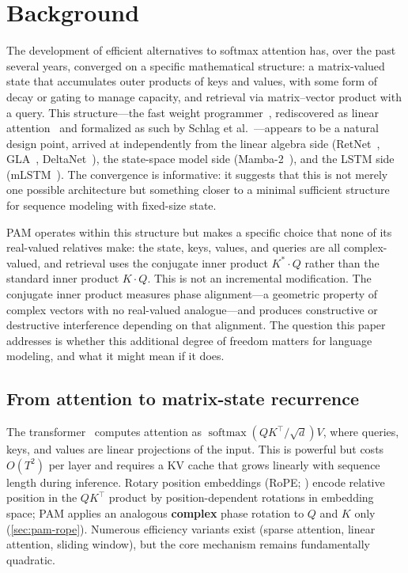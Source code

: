 \documentclass[11pt]{article}
\newcommand{\softmax}{\operatorname{softmax}}
\begin{document}
\section{Background}
\label{sec:related}

The development of efficient alternatives to softmax attention has, over the past several years, converged on a specific mathematical structure: a matrix-valued state that accumulates outer products of keys and values, with some form of decay or gating to manage capacity, and retrieval via matrix--vector product with a query. This structure---the fast weight programmer~\cite{schmidhuber1992learning}, rediscovered as linear attention~\cite{katharopoulos2020transformers} and formalized as such by Schlag et al.~\cite{schlag2021linear}---appears to be a natural design point, arrived at independently from the linear algebra side (RetNet~\cite{sun2023retentive}, GLA~\cite{yang2024gated}, DeltaNet~\cite{yang2024deltanet}), the state-space model side (Mamba-2~\cite{dao2024transformers}), and the LSTM side (mLSTM~\cite{beck2024xlstm}). The convergence is informative: it suggests that this is not merely one possible architecture but something closer to a minimal sufficient structure for sequence modeling with fixed-size state.

PAM operates within this structure but makes a specific choice that none of its real-valued relatives make: the state, keys, values, and queries are all complex-valued, and retrieval uses the conjugate inner product $K^* \cdot Q$ rather than the standard inner product $K \cdot Q$. This is not an incremental modification. The conjugate inner product measures phase alignment---a geometric property of complex vectors with no real-valued analogue---and produces constructive or destructive interference depending on that alignment. The question this paper addresses is whether this additional degree of freedom matters for language modeling, and what it might mean if it does.

\subsection{From attention to matrix-state recurrence}
The transformer~\cite{vaswani2017attention} computes attention as $\softmax(QK^\top / \sqrt{d})V$, where queries, keys, and values are linear projections of the input. This is powerful but costs $O(T^2)$ per layer and requires a KV cache that grows linearly with sequence length during inference. Rotary position embeddings (RoPE; \citealt{su2024roformer}) encode relative position in the $QK^\top$ product by position-dependent rotations in embedding space; PAM applies an analogous \textbf{complex} phase rotation to $Q$ and $K$ only (\cref{sec:pam-rope}). Numerous efficiency variants exist (sparse attention, linear attention, sliding window), but the core mechanism remains fundamentally quadratic.
\end{document}
